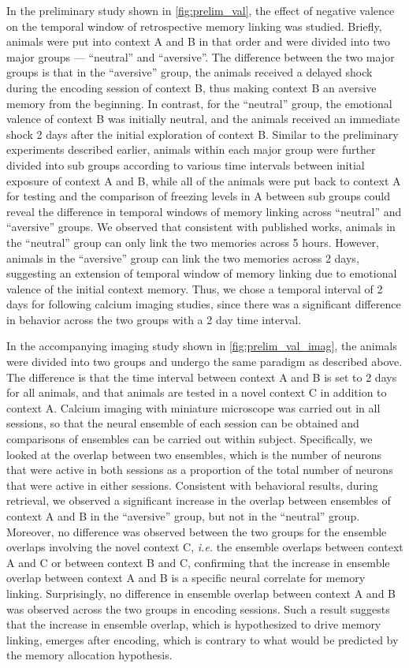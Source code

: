 \documentclass[master.tex]{subfiles}
\begin{document}
In the preliminary study shown in \autoref{fig:prelim_val}, the effect of
negative valence on the temporal window of retrospective memory linking was
studied. Briefly, animals were put into context A and B in that order and were
divided into two major groups --- ``neutral'' and ``aversive''. The difference
between the two major groups is that in the ``aversive'' group, the animals
received a delayed shock during the encoding session of context B, thus making
context B an aversive memory from the beginning. In contrast, for the
``neutral'' group, the emotional valence of context B was initially neutral, and
the animals received an immediate shock 2 days after the initial exploration of
context B. Similar to the preliminary experiments described earlier, animals
within each major group were further divided into sub groups according to
various time intervals between initial exposure of context A and B, while all of
the animals were put back to context A for testing and the comparison of
freezing levels in A between sub groups could reveal the difference in temporal
windows of memory linking across ``neutral'' and ``aversive'' groups. We
observed that consistent with published works, animals in the ``neutral'' group
can only link the two memories across 5 hours. However, animals in the
``aversive'' group can link the two memories across 2 days, suggesting an
extension of temporal window of memory linking due to emotional valence of the
initial context memory. Thus, we chose a temporal interval of 2 days for
following calcium imaging studies, since there was a significant difference in
behavior across the two groups with a 2 day time interval.

In the accompanying imaging study shown in \autoref{fig:prelim_val_imag}, the
animals were divided into two groups and undergo the same paradigm as described
above. The difference is that the time interval between context A and B is set
to 2 days for all animals, and that animals are tested in a novel context C in
addition to context A. Calcium imaging with miniature microscope was carried out
in all sessions, so that the neural ensemble of each session can be obtained and
comparisons of ensembles can be carried out within subject. Specifically, we
looked at the overlap between two ensembles, which is the number of neurons that
were active in both sessions as a proportion of the total number of neurons that
were active in either sessions. Consistent with behavioral results, during
retrieval, we observed a significant increase in the overlap between ensembles
of context A and B in the ``aversive'' group, but not in the ``neutral'' group.
Moreover, no difference was observed between the two groups for the ensemble
overlaps involving the novel context C, \textit{i.e.} the ensemble overlaps
between context A and C or between context B and C, confirming that the increase
in ensemble overlap between context A and B is a specific neural correlate for
memory linking. Surprisingly, no difference in ensemble overlap between context
A and B was observed across the two groups in encoding sessions. Such a result
suggests that the increase in ensemble overlap, which is hypothesized to drive
memory linking, emerges after encoding, which is contrary to what would be
predicted by the memory allocation hypothesis.
\end{document}
